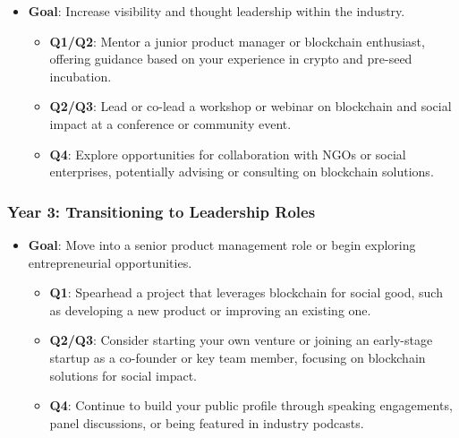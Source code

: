 \begin{itemize}
\tightlist
\item
  \textbf{Goal}: Increase visibility and thought leadership within the
  industry.

  \begin{itemize}
  \tightlist
  \item
    \textbf{Q1/Q2}: Mentor a junior product manager or blockchain
    enthusiast, offering guidance based on your experience in crypto and
    pre-seed incubation.
  \item
    \textbf{Q2/Q3}: Lead or co-lead a workshop or webinar on blockchain and
    social impact at a conference or community event.
  \item
    \textbf{Q4}: Explore opportunities for collaboration with NGOs or
    social enterprises, potentially advising or consulting on blockchain
    solutions.
  \end{itemize}
\end{itemize}

\hypertarget{year-3-transitioning-to-leadership-roles}{%
\subsubsection*{\texorpdfstring{\textbf{Year 3: Transitioning to
Leadership
Roles}}{Year 3: Transitioning to Leadership Roles}}\label{year-3-transitioning-to-leadership-roles}}

\begin{itemize}
\tightlist
\item
  \textbf{Goal}: Move into a senior product management role or begin
  exploring entrepreneurial opportunities.

  \begin{itemize}
  \tightlist
  \item \textbf{Q1}: Spearhead a project that leverages blockchain for social good, such as developing a new product or improving an existing one.
  \item \textbf{Q2/Q3}: Consider starting your own venture or joining an early-stage startup as a co-founder or key team member, focusing on blockchain solutions for social impact.
  \item
    \textbf{Q4}: Continue to build your public profile through speaking
    engagements, panel discussions, or being featured in industry
    podcasts.
  \end{itemize}
\end{itemize}

